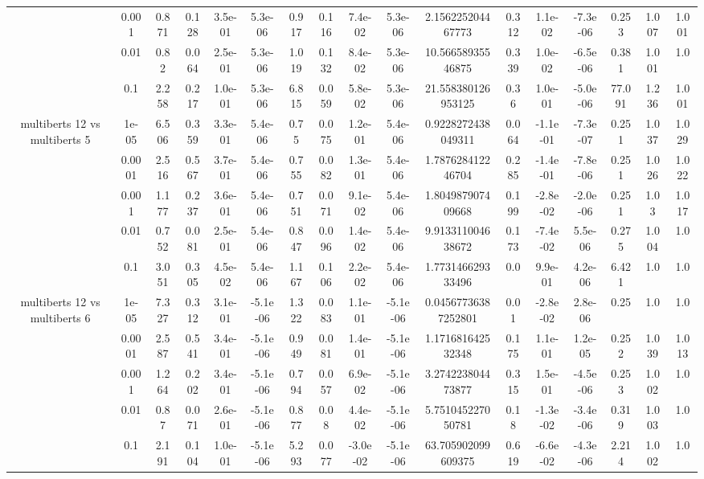\begin{tabular}{|c|c|c|c|c|c|c|c|c|c|c|c|c|c|c|c|c|}
 & 0.001 & 0.871 & 0.128 & 3.5e-01 & 5.3e-06 & 0.917 & 0.116 & 7.4e-02 & 5.3e-06 & 2.156225204467773 & 0.312 & 1.1e-02 & -7.3e-06 & 0.253 & 1.007 & 1.001 \\
 & 0.01 & 0.82 & 0.064 & 2.5e-01 & 5.3e-06 & 1.019 & 0.132 & 8.4e-02 & 5.3e-06 & 10.56658935546875 & 0.339 & 1.0e-02 & -6.5e-06 & 0.381 & 1.001 & 1.0 \\
 & 0.1 & 2.258 & 0.217 & 1.0e-01 & 5.3e-06 & 6.815 & 0.059 & 5.8e-02 & 5.3e-06 & 21.558380126953125 & 0.36 & 1.0e-01 & -5.0e-06 & 77.091 & 1.236 & 1.001 \\
\hline
\multirow{5}{*}{multiberts 12 vs multiberts 5} & 1e-05 & 6.506 & 0.359 & 3.3e-01 & 5.4e-06 & 0.75 & 0.075 & 1.2e-01 & 5.4e-06 & 0.9228272438049311 & 0.064 & -1.1e-01 & -7.3e-07 & 0.251 & 1.037 & 1.029 \\
 & 0.0001 & 2.516 & 0.567 & 3.7e-01 & 5.4e-06 & 0.755 & 0.082 & 1.3e-01 & 5.4e-06 & 1.787628412246704 & 0.285 & -1.4e-01 & -7.8e-06 & 0.251 & 1.026 & 1.022 \\
 & 0.001 & 1.177 & 0.237 & 3.6e-01 & 5.4e-06 & 0.751 & 0.071 & 9.1e-02 & 5.4e-06 & 1.804987907409668 & 0.199 & -2.8e-02 & -2.0e-06 & 0.251 & 1.03 & 1.017 \\
 & 0.01 & 0.752 & 0.081 & 2.5e-01 & 5.4e-06 & 0.847 & 0.096 & 1.4e-02 & 5.4e-06 & 9.913311004638672 & 0.173 & -7.4e-02 & 5.5e-06 & 0.275 & 1.004 & 1.0 \\
 & 0.1 & 3.051 & 0.305 & 4.5e-02 & 5.4e-06 & 1.167 & 0.106 & 2.2e-02 & 5.4e-06 & 1.773146629333496 & 0.0 & 9.9e-01 & 4.2e-06 & 6.421 & 1.0 & 1.0 \\
\hline
\multirow{5}{*}{multiberts 12 vs multiberts 6} & 1e-05 & 7.327 & 0.312 & 3.1e-01 & -5.1e-06 & 1.322 & 0.083 & 1.1e-01 & -5.1e-06 & 0.04567736387252801 & 0.01 & -2.8e-02 & 2.8e-06 & 0.25 & 1.0 & 1.0 \\
 & 0.0001 & 2.587 & 0.541 & 3.4e-01 & -5.1e-06 & 0.949 & 0.081 & 1.4e-01 & -5.1e-06 & 1.171681642532348 & 0.175 & 1.1e-01 & 1.2e-05 & 0.252 & 1.039 & 1.013 \\
 & 0.001 & 1.264 & 0.202 & 3.4e-01 & -5.1e-06 & 0.794 & 0.057 & 6.9e-02 & -5.1e-06 & 3.274223804473877 & 0.315 & 1.5e-01 & -4.5e-06 & 0.253 & 1.002 & 1.0 \\
 & 0.01 & 0.87 & 0.071 & 2.6e-01 & -5.1e-06 & 0.877 & 0.08 & 4.4e-02 & -5.1e-06 & 5.751045227050781 & 0.18 & -1.3e-02 & -3.4e-06 & 0.319 & 1.003 & 1.0 \\
 & 0.1 & 2.191 & 0.104 & 1.0e-01 & -5.1e-06 & 5.293 & 0.077 & -3.0e-02 & -5.1e-06 & 63.705902099609375 & 0.619 & -6.6e-02 & -4.3e-06 & 2.214 & 1.002 & 1.0 \\

\end{tabular}
